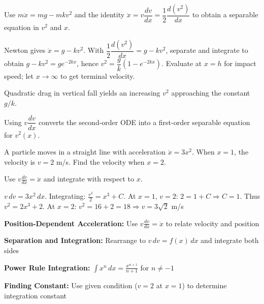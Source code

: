 \begin{hint}
Use $m\ddot{x}=mg-mkv^2$ and the identity $\ddot{x}=v\dfrac{dv}{dx}=\dfrac{1}{2}\dfrac{d(v^2)}{dx}$ to obtain a separable equation in $v^2$ and $x$.
\end{hint}

\begin{solution}
Newton gives $\ddot{x}=g-kv^2$. With $\dfrac{1}{2}\dfrac{d(v^2)}{dx}=g-kv^2$, separate and integrate to obtain $g-kv^2=ge^{-2kx}$, hence $v^2=\dfrac{g}{k}(1-e^{-2kx})$. Evaluate at $x=h$ for impact speed; let $x\to\infty$ to get terminal velocity.
\end{solution}

\begin{takeaways}
\item Quadratic drag in vertical fall yields an increasing $v^2$ approaching the constant $g/k$.
\item Using $v\dfrac{dv}{dx}$ converts the second-order ODE into a first-order separable equation for $v^2(x)$.
\end{takeaways}
\begin{problem}
A particle moves in a straight line with acceleration $\ddot{x} = 3x^2$. When $x = 1$, the velocity is $v = 2$ m/s. Find the velocity when $x = 2$.
\end{problem}

\begin{hint}
Use $v\frac{dv}{dx} = \ddot{x}$ and integrate with respect to $x$.
\end{hint}

\begin{solution}
$v\,dv = 3x^2\,dx$. Integrating: $\frac{v^2}{2} = x^3 + C$. At $x=1$, $v=2$: $2 = 1 + C \Rightarrow C = 1$. Thus $v^2 = 2x^3 + 2$. At $x=2$: $v^2 = 16 + 2 = 18 \Rightarrow v = 3\sqrt{2}$ m/s
\end{solution}

\begin{takeaways}
\item \textbf{Position-Dependent Acceleration:} Use $v\frac{dv}{dx} = \ddot{x}$ to relate velocity and position
\item \textbf{Separation and Integration:} Rearrange to $v\,dv = f(x)\,dx$ and integrate both sides
\item \textbf{Power Rule Integration:} $\int x^n\,dx = \frac{x^{n+1}}{n+1}$ for $n \neq -1$
\item \textbf{Finding Constant:} Use given condition ($v=2$ at $x=1$) to determine integration constant
\end{takeaways}

